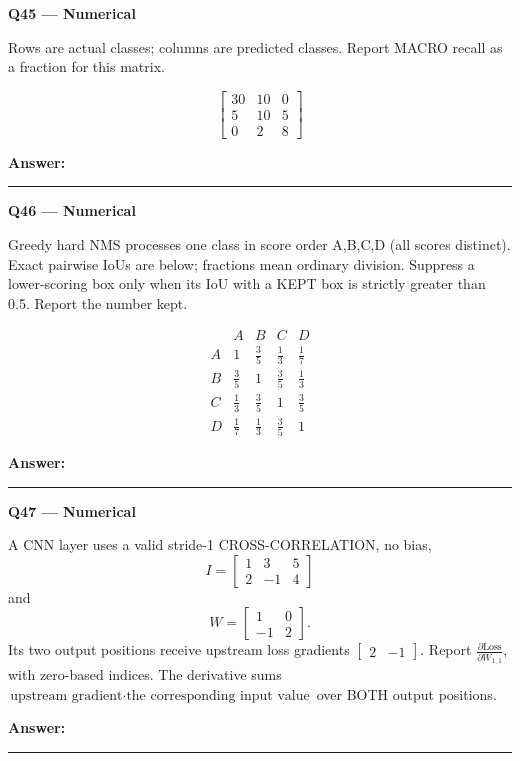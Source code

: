\documentclass[11pt,a4paper]{article}
\begin{document}
\par\vspace{12pt}
\begin{minipage}{\linewidth}
\textbf{Q45 — Numerical}\par\smallskip
Rows are actual classes; columns are predicted classes. Report MACRO recall as a fraction for this matrix.


\[
\begin{bmatrix}30&10&0\\5&10&5\\0&2&8\end{bmatrix}
\]

\par\medskip\textbf{Answer:} \rule{55mm}{0.4pt}
\end{minipage}
\par\vspace{12pt}
\begin{minipage}{\linewidth}
\textbf{Q46 — Numerical}\par\smallskip
Greedy hard NMS processes one class in score order A,\allowbreak{}B,\allowbreak{}C,\allowbreak{}D (all scores distinct). Exact pairwise IoUs are below; fractions mean ordinary division. Suppress a lower-scoring box only when its IoU with a KEPT box is strictly greater than 0.5. Report the number kept.


\[
\begin{array}{c|rrrr}&A&B&C&D\\\hline A&1&\frac{3}{5}&\frac{1}{3}&\frac{1}{7}\\[6pt]B&\frac{3}{5}&1&\frac{3}{5}&\frac{1}{3}\\[6pt]C&\frac{1}{3}&\frac{3}{5}&1&\frac{3}{5}\\[6pt]D&\frac{1}{7}&\frac{1}{3}&\frac{3}{5}&1\end{array}
\]

\par\medskip\textbf{Answer:} \rule{55mm}{0.4pt}
\end{minipage}
\par\vspace{12pt}
\begin{minipage}{\linewidth}
\textbf{Q47 — Numerical}\par\smallskip
A CNN layer uses a valid stride-1 CROSS-CORRELATION,\allowbreak{} no bias,\allowbreak{}
\[I=\begin{bmatrix}1&3&5\\2&-1&4\end{bmatrix}\]
 and
\[W=\begin{bmatrix}1&0\\-1&2\end{bmatrix}.\]
 Its two output positions receive upstream loss gradients \(\begin{bmatrix}2&-1\end{bmatrix}\). Report \(\frac{\partial\mathrm{Loss}}{\partial W_{1,1}}\),\allowbreak{} with zero-based indices. The derivative sums \(\text{upstream gradient}\cdot\text{the corresponding input value}\) over BOTH output positions.
\par\medskip\textbf{Answer:} \rule{55mm}{0.4pt}
\end{minipage}
\end{document}
